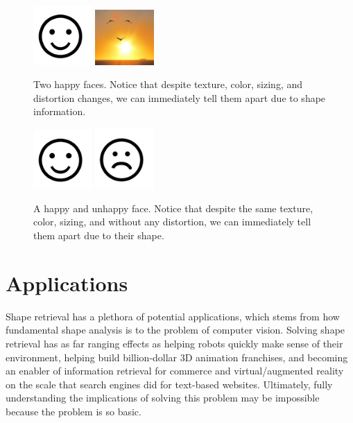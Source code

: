 \documentclass[../tech_report_1.tex]{subfiles}
\begin{document}
\begin{figure}[!ht]
  \centering
    \includegraphics[width=0.2\textwidth]{happy_face}
    \includegraphics[width=0.2\textwidth]{happy_face_2}
  \caption{Two happy faces. Notice that despite texture, color, sizing, and distortion changes, we can immediately tell them apart due to shape information. \label{fig:same_shapes}}
\end{figure}


\begin{figure}[!ht]
  \centering
    \includegraphics[width=0.2\textwidth]{happy_face}
    \includegraphics[width=0.2\textwidth]{unhappy_face}
  \caption{A happy and unhappy face. Notice that despite the same texture, color, sizing, and without any distortion, we can immediately tell them apart due to their shape. \label{fig:different_shapes}}
\end{figure}

\section{Applications}

Shape retrieval has a plethora of potential applications, which stems from how fundamental shape analysis is to the problem of computer vision. Solving shape retrieval has as far ranging effects as helping robots quickly make sense of their environment, helping build billion-dollar 3D animation franchises, and becoming an enabler of information retrieval for commerce and virtual/augmented reality on the scale that search engines did for text-based websites. Ultimately, fully understanding the implications of solving this problem may be impossible because the problem is so basic.
\end{document}
